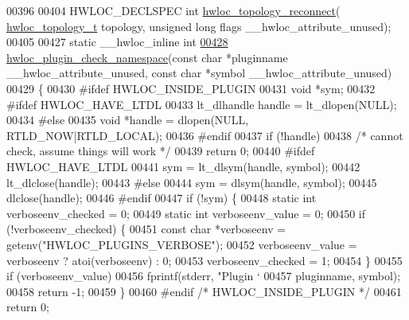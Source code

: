 \begin{DoxyCode}
00396 
00404 HWLOC\_DECLSPEC \textcolor{keywordtype}{int} \hyperlink{a00230_ga120d8bd74922e1030b621409a6b0be61}{hwloc\_topology\_reconnect}(
      \hyperlink{a00186_ga9d1e76ee15a7dee158b786c30b6a6e38}{hwloc\_topology\_t} topology, \textcolor{keywordtype}{unsigned} \textcolor{keywordtype}{long} flags \_\_hwloc\_attribute\_unused);
00405 
00427 \textcolor{keyword}{static} \_\_hwloc\_inline \textcolor{keywordtype}{int}
\hyperlink{a00230_gac2eaed287bb215cf0bd33014e9e1d374}{00428} \hyperlink{a00230_gac2eaed287bb215cf0bd33014e9e1d374}{hwloc\_plugin\_check\_namespace}(\textcolor{keyword}{const} \textcolor{keywordtype}{char} *pluginname \_\_hwloc\_attribute\_unused, \textcolor{keyword}{
      const} \textcolor{keywordtype}{char} *symbol \_\_hwloc\_attribute\_unused)
00429 \{
00430 \textcolor{preprocessor}{#ifdef HWLOC\_INSIDE\_PLUGIN}
00431   \textcolor{keywordtype}{void} *sym;
00432 \textcolor{preprocessor}{#ifdef HWLOC\_HAVE\_LTDL}
00433   lt\_dlhandle handle = lt\_dlopen(NULL);
00434 \textcolor{preprocessor}{#else}
00435   \textcolor{keywordtype}{void} *handle = dlopen(NULL, RTLD\_NOW|RTLD\_LOCAL);
00436 \textcolor{preprocessor}{#endif}
00437   \textcolor{keywordflow}{if} (!handle)
00438     \textcolor{comment}{/* cannot check, assume things will work */}
00439     \textcolor{keywordflow}{return} 0;
00440 \textcolor{preprocessor}{#ifdef HWLOC\_HAVE\_LTDL}
00441   sym = lt\_dlsym(handle, symbol);
00442   lt\_dlclose(handle);
00443 \textcolor{preprocessor}{#else}
00444   sym = dlsym(handle, symbol);
00445   dlclose(handle);
00446 \textcolor{preprocessor}{#endif}
00447   \textcolor{keywordflow}{if} (!sym) \{
00448     \textcolor{keyword}{static} \textcolor{keywordtype}{int} verboseenv\_checked = 0;
00449     \textcolor{keyword}{static} \textcolor{keywordtype}{int} verboseenv\_value = 0;
00450     \textcolor{keywordflow}{if} (!verboseenv\_checked) \{
00451       \textcolor{keyword}{const} \textcolor{keywordtype}{char} *verboseenv = getenv(\textcolor{stringliteral}{"HWLOC\_PLUGINS\_VERBOSE"});
00452       verboseenv\_value = verboseenv ? atoi(verboseenv) : 0;
00453       verboseenv\_checked = 1;
00454     \}
00455     \textcolor{keywordflow}{if} (verboseenv\_value)
00456       fprintf(stderr, \textcolor{stringliteral}{"Plugin `%
00457               pluginname, symbol);
00458     \textcolor{keywordflow}{return} -1;
00459   \}
00460 \textcolor{preprocessor}{#endif }\textcolor{comment}{/* HWLOC\_INSIDE\_PLUGIN */}\textcolor{preprocessor}{}
00461   \textcolor{keywordflow}{return} 0;
}
\end{DoxyCode}
